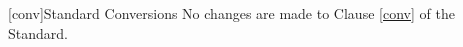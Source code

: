 %

\begingroup
\renewcommand{\cleardoublepage}{}
\renewcommand{\clearpage}{}
[conv]{Standard Conversions}
\endgroup
No changes are made to Clause \ref{conv} of the \Cpp Standard.
